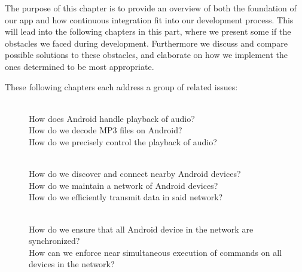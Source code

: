The purpose of this chapter is to provide an overview of both the foundation of our app and how continuous integration fit into our development process.
This will lead into the following chapters in this part, where we present some if the obstacles we faced during development.
Furthermore we discuss and compare possible solutions to these obstacles, and elaborate on how we implement the ones determined to be most appropriate.

These following chapters each address a group of related issues:
\begin{description}
    \item[] \hfill\\
        How does Android handle playback of audio?\\
        How do we decode MP3 files on Android?\\
        How do we precisely control the playback of audio?
    \item[] \hfill\\
        How do we discover and connect nearby Android devices?\\
        How do we maintain a network of Android devices?\\
        How do we efficiently transmit data in said network?
    \item[] \hfill\\
        How do we ensure that all Android device in the network are synchronized?\\
        How can we enforce near simultaneous execution of commands on all devices in the network?
\end{description}
